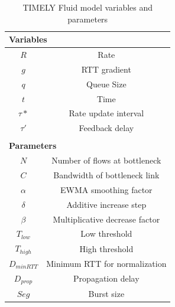 \begin{table}[t]
\center
{
\footnotesize
{
\begin{tabular}{|c|c|}
\multicolumn{2}{l}{\bf Variables} \\ \hline
$R$ & Rate \\ \hline
$g$ & RTT gradient\\ \hline
$q$ & Queue Size \\ \hline
$t$ & Time \\ \hline
$\tau*$ & Rate update interval \\ \hline
$\tau'$ & Feedback delay \\ \hline
\multicolumn{2}{c}{} \\
\multicolumn{2}{l}{\bf Parameters} \\ \hline
$N$ & Number of flows at bottleneck\\ \hline
$C$ & Bandwidth of bottleneck link\\ \hline
$\alpha$ & EWMA smoothing factor\\ \hline
$\delta$ & Additive increase step\\ \hline
$\beta$ & Multiplicative decrease factor\\ \hline
$T_{low}$ & Low threshold\\ \hline
$T_{high}$ & High threshold\\ \hline
$D_{minRTT}$ & Minimum RTT for normalization \\ \hline
$D_{prop}$ & Propagation delay \\ \hline
$Seg$ & Burst size \\ \hline
\end{tabular}
}
}
\caption{TIMELY Fluid model variables and parameters}
\vspace{-1em}
\label{tab:timely_varparam}
\end{table}

